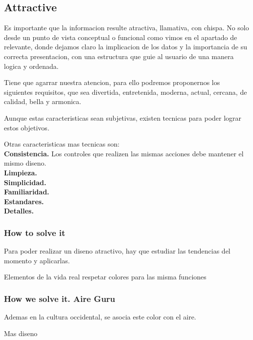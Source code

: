 \subsection{Attractive}
Es importante que la informacion resulte atractiva, llamativa, con chispa. No solo desde un punto de vista conceptual
o funcional como vimos en el apartado de relevante, donde dejamos claro la implicacion de los datos y la importancia
de su correcta presentacion, con una estructura que guie al usuario de una manera logica y ordenada.

Tiene que agarrar nuestra atencion, para ello podremos proponernos los siguientes requisitos, que sea divertida, entretenida,
moderna, actual, cercana, de calidad, bella y armonica.

Aunque estas caracteristicas sean subjetivas, existen tecnicas para poder lograr estos objetivos.

Otras caracteristicas mas tecnicas son:\\
 
\textbf{Consistencia.} Los controles que realizen las mismas acciones debe mantener el mismo diseno.\\

\textbf{Limpieza.} \\

\textbf{Simplicidad.} \\

\textbf{Familiaridad.} \\

\textbf{Estandares.} \\

\textbf{Detalles.} \\



\subsubsection{How to solve it} 
Para poder realizar un diseno atractivo, hay que estudiar las tendencias del momento y aplicarlas. 

Elementos de la vida real
respetar colores para las misma funciones
\subsubsection{How we solve it. Aire Guru} 
Ademas en la 
cultura occidental, se asocia este color con el aire.

\begin{itemize}
    \done
    \crossed
    \crossed Mas diseno
\end{itemize}

